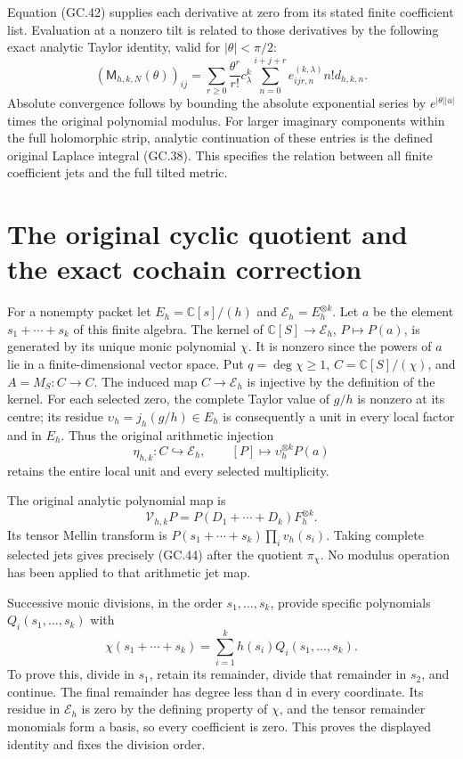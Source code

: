 \documentclass[11pt]{article}
\begin{document}
Equation (GC.42) supplies each derivative at zero from its stated
finite coefficient list. Evaluation at a nonzero tilt is related to
those derivatives by the following exact analytic Taylor identity,
valid for $|\theta|<\pi/2$:
\[
 (\mathsf M_{h,k,N}(\theta))_{ij}
 =\sum_{r\ge0}\frac{\theta^r}{r!}
       c_\lambda^k\sum_{n=0}^{i+j+r}
                    e_{ijr,n}^{(k,\lambda)}n!d_{h,k,n}.        \tag{GC.43}
\]
Absolute convergence follows by bounding the absolute exponential
series by $e^{|\theta||u|}$ times the original polynomial modulus.
For larger imaginary components within the full holomorphic strip,
analytic continuation of these entries is the defined original
Laplace integral (GC.38). This specifies the relation between all
finite coefficient jets and the full tilted metric.

\section{The original cyclic quotient and the exact cochain correction}

For a nonempty packet let $E_h=\mathbb C[s]/(h)$ and
$\mathcal E_h=E_h^{\otimes k}$. Let $a$ be the element
$s_1+\cdots+s_k$ of this finite algebra. The kernel of
$\mathbb C[S]\to\mathcal E_h$, $P\mapsto P(a)$, is generated by
its unique monic polynomial $\chi$. It is nonzero since the powers
of $a$ lie in a finite-dimensional vector space. Put
$q=\deg\chi\ge1$, $C=\mathbb C[S]/(\chi)$, and $A=M_S:C\to C$.
The induced map $C\to\mathcal E_h$ is injective by the definition
of the kernel. For each selected zero, the complete Taylor value of
$g/h$ is nonzero at its centre; its residue
$\upsilon_h=j_h(g/h)\in E_h$ is consequently a unit in every
local factor and in $E_h$. Thus the original arithmetic injection
\[
 \eta_{h,k}:C\hookrightarrow\mathcal E_h,\qquad
 [P]\mapsto\upsilon_h^{\otimes k}P(a)                           \tag{GC.44}
\]
retains the entire local unit and every selected multiplicity.

The original analytic polynomial map is
\[
 \mathcal V_{h,k}P=P(D_1+\cdots+D_k)F_h^{\otimes k}.             \tag{GC.45}
\]
Its tensor Mellin transform is
$P(s_1+\cdots+s_k)\prod_i v_h(s_i)$. Taking complete selected
jets gives precisely (GC.44) after the quotient $\pi_\chi$.
No modulus operation has been applied to that arithmetic jet map.

Successive monic divisions, in the order $s_1,\ldots,s_k$, provide
specific polynomials $Q_i(s_1,\ldots,s_k)$ with
\[
 \chi(s_1+\cdots+s_k)=\sum_{i=1}^k h(s_i)Q_i(s_1,\ldots,s_k).
                                                               \tag{GC.46}
\]
To prove this, divide in $s_1$, retain its remainder, divide that
remainder in $s_2$, and continue. The final remainder has degree
less than d in every coordinate. Its residue in $\mathcal E_h$ is
zero by the defining property of $\chi$, and the tensor remainder
monomials form a basis, so every coefficient is zero. This proves
the displayed identity and fixes the division order.
\end{document}
